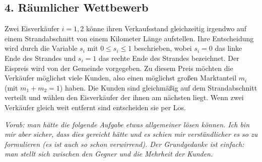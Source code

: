 \documentclass[12pt]{article}
\begin{document}
\newpage

\subsection*{4. Räumlicher Wettbewerb}

Zwei Eisverkäufer $i =1, 2$ könne ihren Verkaufsstand gleichzeitig irgendwo auf einem Strandabschnitt von einem Kilometer Länge aufstellen. Ihre Entscheidung wird durch die Variable $s_i$ mit $0 \leq s_i \leq 1$ beschrieben, wobei $s_i = 0$ das linke Ende des Strandes und $s_i = 1$ das rechte Ende des Strandes bezeichnet. Der Eispreis wird von der Gemeinde vorgegeben. Zu diesem Preis möchten die Verkäufer möglichst viele Kunden, also einen möglichst großen Marktanteil $m_i$ (mit $m_1 + m_2 = 1$) haben. Die Kunden sind gleichmäßig auf dem Strandabschnitt verteilt und wählen den Eisverkäufer der ihnen am nächsten liegt. Wenn zwei Verkäufer gleich weit entfernt sind entscheiden sie per Los. ~\bigskip

\textit{Vorab: man hätte die folgende Aufgabe etwas allgemeiner lösen können. Ich bin mir aber sicher, dass dies gereicht hätte und es schien mir verständlicher es so zu formulieren (es ist auch so schon verwirrend). Der Grundgedanke ist einfach: man stellt sich zwischen den Gegner und die Mehrheit der Kunden.}
\end{document}
